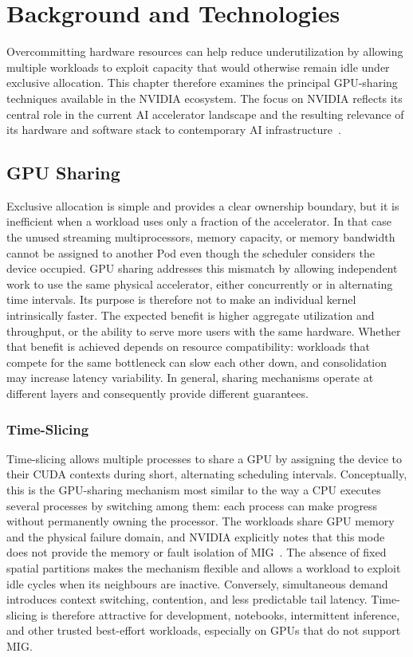 \chapter{Background and Technologies}
\label{chap:background}

Overcommitting hardware resources can help reduce underutilization by allowing multiple workloads to exploit capacity that would otherwise remain idle under exclusive allocation. This chapter therefore examines the principal GPU-sharing techniques available in the NVIDIA ecosystem. The focus on NVIDIA reflects its central role in the current AI accelerator landscape and the resulting relevance of its hardware and software stack to contemporary AI infrastructure~\cite{nvidia2026annualreport}.

\section{GPU Sharing}
\label{sec:gpu-sharing}

Exclusive allocation is simple and provides a clear ownership boundary, but it is inefficient when a workload uses only a fraction of the accelerator. In that case the unused streaming multiprocessors, memory capacity, or memory bandwidth cannot be assigned to another Pod even though the scheduler considers the device occupied. GPU sharing addresses this mismatch by allowing independent work to use the same physical accelerator, either concurrently or in alternating time intervals. Its purpose is therefore not to make an individual kernel intrinsically faster. The expected benefit is higher aggregate utilization and throughput, or the ability to serve more users with the same hardware. Whether that benefit is achieved depends on resource compatibility: workloads that compete for the same bottleneck can slow each other down, and consolidation may increase latency variability. In general, sharing mechanisms operate at different layers and consequently provide different guarantees.

\subsection{Time-Slicing}

Time-slicing allows multiple processes to share a GPU by assigning the device to their CUDA contexts during short, alternating scheduling intervals. Conceptually, this is the GPU-sharing mechanism most similar to the way a CPU executes several processes by switching among them: each process can make progress without permanently owning the processor. The workloads share GPU memory and the physical failure domain, and NVIDIA explicitly notes that this mode does not provide the memory or fault isolation of MIG~\cite{nvidia2026timeslicing}. The absence of fixed spatial partitions makes the mechanism flexible and allows a workload to exploit idle cycles when its neighbours are inactive. Conversely, simultaneous demand introduces context switching, contention, and less predictable tail latency. Time-slicing is therefore attractive for development, notebooks, intermittent inference, and other trusted best-effort workloads, especially on GPUs that do not support MIG.

